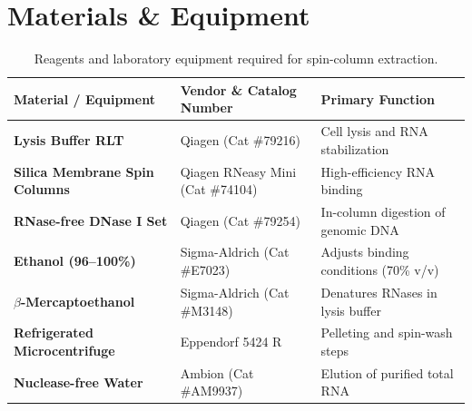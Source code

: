\section{Materials \& Equipment}
\begin{table}[H]
\small
\caption{Reagents and laboratory equipment required for spin-column extraction.}
\label{tab:materials}
\vspace{2pt}
\renewcommand{\arraystretch}{1.1}
\begin{tabularx}{\linewidth}{@{}>{\bfseries}l@{\hspace{6mm}}X@{\hspace{6mm}}X@{}}
\toprule
\color{primary}Material / Equipment & \color{primary}Vendor \& Catalog Number & \color{primary}Primary Function \\
\midrule
Lysis Buffer RLT & Qiagen (Cat \#79216) & Cell lysis and RNA stabilization \\
Silica Membrane Spin Columns & Qiagen RNeasy Mini (Cat \#74104) & High-efficiency RNA binding \\
RNase-free DNase I Set & Qiagen (Cat \#79254) & In-column digestion of genomic DNA \\
Ethanol (96--100\%) & Sigma-Aldrich (Cat \#E7023) & Adjusts binding conditions (70\% v/v) \\
$\beta$-Mercaptoethanol & Sigma-Aldrich (Cat \#M3148) & Denatures RNases in lysis buffer \\
Refrigerated Microcentrifuge & Eppendorf 5424 R & Pelleting and spin-wash steps \\
Nuclease-free Water & Ambion (Cat \#AM9937) & Elution of purified total RNA \\
\bottomrule
\end{tabularx}
\end{table}
